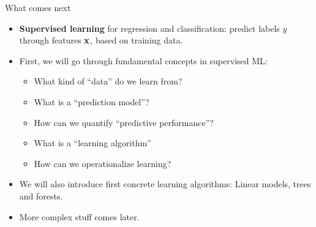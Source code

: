 \documentclass[11pt,compress,t,notes=noshow, xcolor=table]{beamer}
\begin{document}



\begin{frame}{What comes next}

\begin{itemize}

\item \textbf{Supervised learning} for regression 
and classification: predict labels $y$ through features $\mathbf{x}$, based on training data.
  
  \item First, we will go through fundamental concepts in supervised ML: 
  \begin{itemize}
  
    \item What kind of ``data'' do we learn from?
    \item What is a ``prediction model''?
    \item How can we quantify ``predictive performance''?
    \item What is a ``learning algorithm'' 
    \item How can we operationalize learning?
  
  \end{itemize}
  
  \item We will also introduce first concrete learning algorithms: 
  Linear models, trees and forests. 
  
  \item More complex stuff comes later.
  
\end{itemize}

\end{frame}



\endlecture
\end{document}
